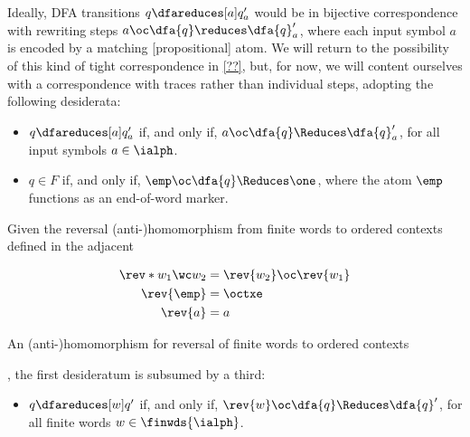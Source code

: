 

Ideally, \ac{DFA} transitions $q \dfareduces[a] q'_a$ would be in bijective correspondence with rewriting steps $a \oc \dfa{q} \reduces \dfa{q}'_a$, where each input symbol $a$ is encoded by a matching [propositional] atom.
%
We will return to the possibility of this kind of tight correspondence in \cref{??}, but,
%
for now, we will content ourselves with a correspondence with traces rather than individual steps, adopting the following desiderata:
%
\begin{itemize}
\item
  $q \dfareduces[a] q'_a$ if, and only if, $a \oc \dfa{q} \Reduces \dfa{q}'_a$, for all input symbols $a \in \ialph$.
\item
  $q \in F$ if, and only if, $\emp \oc \dfa{q} \Reduces \one$, where the atom $\emp$ functions as an end-of-word marker.
\end{itemize}
Given the reversal (anti-)\-homo\-morph\-ism from finite words to ordered contexts defined in the adjacent %
\begin{marginfigure}
  \begin{align*}
    \rev*{w_1 \wc w_2} &= \rev{w_2} \oc \rev{w_1} \\
    \rev{\emp} &= \octxe \\
    \rev{a} &= a
  \end{align*}
  \caption{An (anti-)\-homo\-morph\-ism for reversal of finite words to ordered contexts}\label{fig:ordered-rewriting:reversal}
\end{marginfigure}%
, the first desideratum is subsumed by a third:
\begin{itemize}[resume*]
\item $q \dfareduces[w] q'$ if, and only if, $\rev{w} \oc \dfa{q} \Reduces \dfa{q}'$, for all finite words $w \in \finwds{\ialph}$.
\end{itemize}

